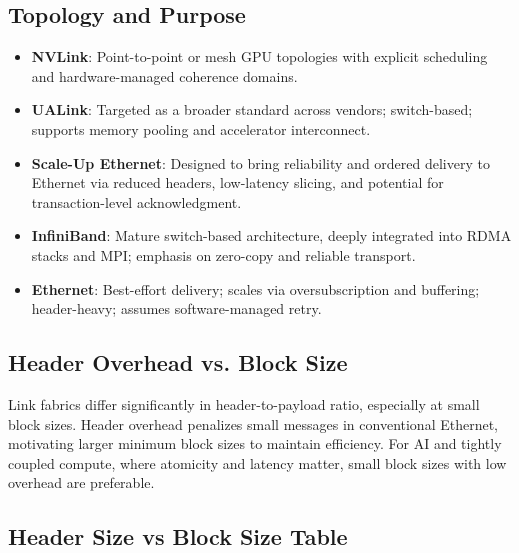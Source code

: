 \documentclass[../../../OAE-SPEC-MAIN.tex]{subfiles}
\begin{document}
\subsection{Topology and Purpose}


\begin{itemize}
  \item \textbf{NVLink}: Point-to-point or mesh GPU topologies with explicit scheduling and hardware-managed coherence domains.
  \item \textbf{UALink}: Targeted as a broader standard across vendors; switch-based; supports memory pooling and accelerator interconnect.
  \item \textbf{Scale-Up Ethernet}: Designed to bring reliability and ordered delivery to Ethernet via reduced headers, low-latency slicing, and potential for transaction-level acknowledgment.
  \item \textbf{InfiniBand}: Mature switch-based architecture, deeply integrated into RDMA stacks and MPI; emphasis on zero-copy and reliable transport.
  \item \textbf{Ethernet}: Best-effort delivery; scales via oversubscription and buffering; header-heavy; assumes software-managed retry.
\end{itemize}

\subsection{Header Overhead vs. Block Size}

Link fabrics differ significantly in header-to-payload ratio, especially at small block sizes. Header overhead penalizes small messages in conventional Ethernet, motivating larger minimum block sizes to maintain efficiency. For AI and tightly coupled compute, where atomicity and latency matter, small block sizes with low overhead are preferable.

\subsection{Header Size vs Block Size Table}
\end{document}
